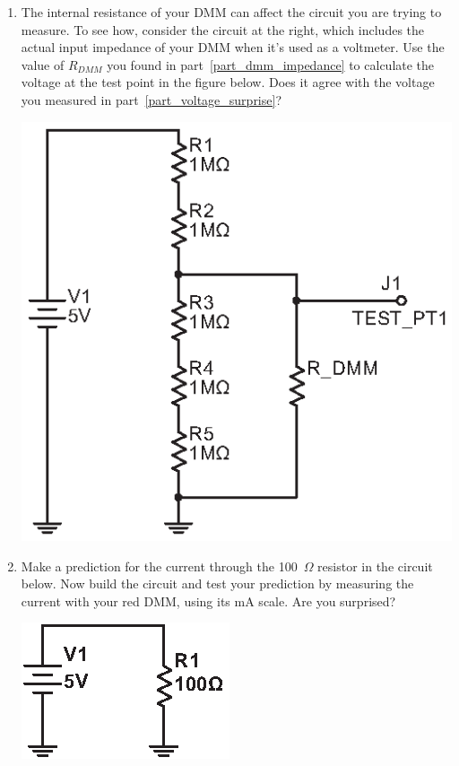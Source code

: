 \begin{enumerate}[wide]
\item The internal resistance of your DMM can affect the circuit you are trying to measure.  To see how, consider the circuit at the right, which includes the actual input impedance of your DMM when it's used as a voltmeter.  Use the value of $R_{DMM}$ you found in part~\ref{part_dmm_impedance} to calculate the voltage at the test point in the figure below.  Does it agree with the voltage you measured in part~\ref{part_voltage_surprise}?

\begin{center}
\includegraphics{input_output_impedance/input_impedance2.eps}
\end{center}

\item Make a prediction for the current through the 100~$\Omega$ resistor in the circuit below.  Now build the circuit and test your prediction by measuring the current with your red DMM, using its mA scale.  Are you surprised? \label{part_current_surprise}
 
\begin{center}
\includegraphics{input_output_impedance/current_measurement.eps}
\end{center}


\end{enumerate}
